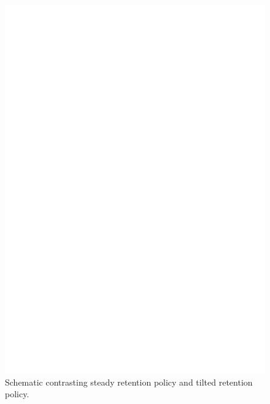 \begin{figure}
  \centering
  \includegraphics[width=\linewidth]{img/steady-vs-tilted-schematic}
  \caption{Schematic contrasting steady retention policy and tilted retention policy.}
  \label{fig:steady-vs-tilted-schematic}
\end{figure}
